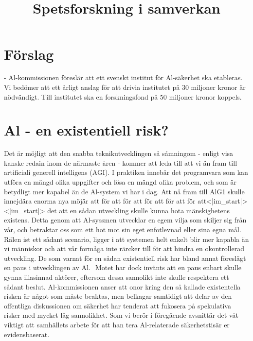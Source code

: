 {{{{{{{{\section*{Förslag}
- Al-kommissionen föreslär att ett svenskt institut för Al-säkerhet ska etableras. Vi bedömer att ett årligt anslag för att drivia institutet på 30 miljoner kronor är nödvändigt. Till institutet ska en forskningsfond på 50 miljoner kronor koppels.
\section*{Al - en existentiell risk?}
Det är möjligt att den snabba teknikutvecklingen så såmningom - enligt visa kanske redain inom de närmaste åren - kommer att leda till att vi än fram till artificiali generell intelligens (AGI). I praktiken innebär det programvara som kan utföra en mängd olika uppgifter och lösa en mängd olika problem, och som är betydligt mer kapabel än de Al-system vi har i dag. Att nå fram till AlG1 skulle innejdära enorma nya möjär att för att för att för att för att för att<|im_start|><|im_start|> det att en sådan utveckling skulle kunna hota mänskighetens existens. Detta genom att Al-syssmen utvecklar en egem vilja som skiljer sig från vår, och betraktar oss som ett hot mot sin eget enfotlevnad eller sina egna mål. Rälen ist ett sådant scenario, ligger i att systemen helt enkelt blir mer kapabla än vi människor och att vår formåga inte rärcker till för att hindra en okontrollerad utveckling.
De som varnat för en sådan existentiell risk har bland annat föreslägt en paus i utvecklingen av Al. \({ }^{}\) Motet har dock invänts att en paus enbart skulle gynna illasinnad aktörer, eftersom dessa sannolikt inte skulle respektera ett sådant beslut. Al-kommissionen anser att onor kring den så kallade existentella risken är något som måste beaktas, men belkagar samtidigt att delar av den offentliga diskussionen om säkerhet har tenderat att fukosera på spekulativa risker med mycket låg sannolikhet. Som vi berör i föregående avsnittär det våt viktigt att samhällets arbete för att han tera Al-relaterade säkerhetstisär er evidensbaserat.

\title{
Spetsforskning i samverkan
}
}}}}}}}}
